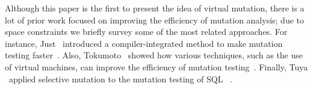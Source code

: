  Although this paper is the first to present the idea of virtual mutation, there is a lot of prior work focused on improving the efficiency of mutation analysis; due to space constraints we briefly survey some of the most related approaches. For instance, Just \etal~introduced a compiler-integrated method to make mutation testing faster~\cite{Just2011}. Also, Tokumoto \etal~showed how various techniques, such as the use of virtual machines, can improve the efficiency of mutation testing~\cite{Tokumoto2016}. Finally, Tuya \etal~applied selective mutation to the mutation testing of SQL \SELECTs~\cite{Tuya2007}.


